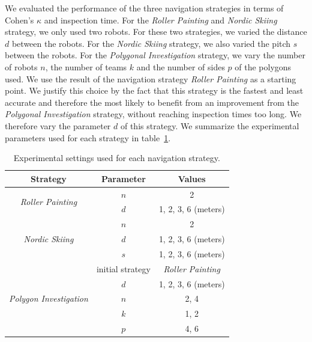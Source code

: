 We evaluated the performance of the three navigation strategies in terms of Cohen's $\kappa$ and inspection time.
For the \textit{Roller Painting} and \textit{Nordic Skiing} strategy, we only used two robots.
For these two strategies, we varied the distance $d$ between the robots.
For the \textit{Nordic Skiing} strategy, we also varied the pitch $s$ between the robots.
For the \textit{Polygonal Investigation} strategy, we vary the number of robots $n$, the number of teams $k$ and the number of sides $p$ of the polygons used.
We use the result of the navigation strategy \textit{Roller Painting} as a starting point.
We justify this choice by the fact that this strategy is the fastest and least accurate and therefore the most likely to benefit from an improvement from the \textit{Polygonal Investigation} strategy, without reaching inspection times too long.
We therefore vary the parameter $d$ of this strategy.
We summarize the experimental parameters used for each strategy in table~\ref{tab:exp_params}.

\begin{table}[h!]
	\centering
	\begin{tabular}{|c|c|c|}
		\hline
		Strategy & Parameter & Values \\
		\hline
		\multirow{2}{*}{\textit{Roller Painting}} & $n$ & 2 \\
		& $d$ & 1, 2, 3, 6 (meters) \\
		\hline
		\multirow{3}{*}{\textit{Nordic Skiing}} & $n$ & 2 \\
		& $d$ & 1, 2, 3, 6 (meters) \\
		& $s$ & 1, 2, 3, 6 (meters) \\
		\hline
		\multirow{5}{*}{\textit{Polygon Investigation}} & initial strategy & \textit{Roller Painting} \\
		& $d$ & 1, 2, 3, 6 (meters) \\
		& $n$ & 2, 4 \\
		& $k$ & 1, 2 \\
		& $p$ & 4, 6 \\
		\hline
	\end{tabular}
	\caption{Experimental settings used for each navigation strategy.}
	\label{tab:exp_params}
\end{table}

